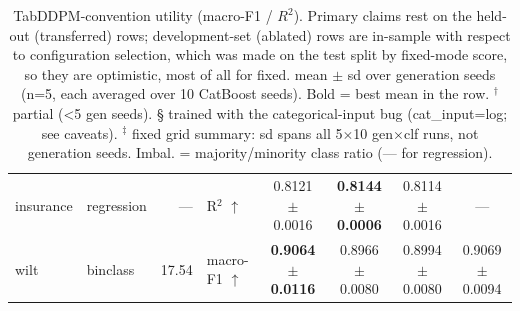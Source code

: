 \begin{table}[t]
\begin{tabular}{llrlcccc}
insurance & regression & — & R$^2$ $\uparrow$ & 0.8121 $\pm$ 0.0016 & \textbf{0.8144 $\pm$ 0.0006} & 0.8114 $\pm$ 0.0016 & --- \\
wilt & binclass & 17.54 & macro-F1 $\uparrow$ & \textbf{0.9064 $\pm$ 0.0116} & 0.8966 $\pm$ 0.0080 & 0.8994 $\pm$ 0.0080 & 0.9069 $\pm$ 0.0094 \\
\bottomrule
\end{tabular}
\caption{TabDDPM-convention utility (macro-F1 / $R^2$). Primary claims rest on the held-out (transferred) rows; development-set (ablated) rows are in-sample with respect to configuration selection, which was made on the test split by fixed-mode score, so they are optimistic, most of all for fixed. mean $\pm$ sd over generation seeds (n=5, each averaged over 10 CatBoost seeds). Bold = best mean in the row. $^\dagger$ partial (<5 gen seeds). § trained with the categorical-input bug (cat_input=log; see caveats). $^\ddagger$ fixed grid summary: sd spans all 5$\times$10 gen$\times$clf runs, not generation seeds. Imbal. = majority/minority class ratio (— for regression).}
\end{table}

